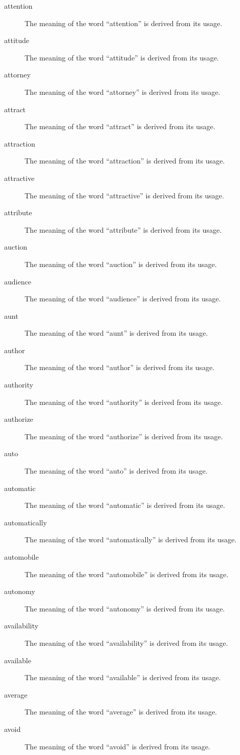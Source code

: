 \documentclass[12pt, letterpaper]{memoir}
\begin{document}
\begin{description}
\item[attention] The meaning of the word ``attention'' is derived from its usage.
\item[attitude] The meaning of the word ``attitude'' is derived from its usage.
\item[attorney] The meaning of the word ``attorney'' is derived from its usage.
\item[attract] The meaning of the word ``attract'' is derived from its usage.
\item[attraction] The meaning of the word ``attraction'' is derived from its usage.
\item[attractive] The meaning of the word ``attractive'' is derived from its usage.
\item[attribute] The meaning of the word ``attribute'' is derived from its usage.
\item[auction] The meaning of the word ``auction'' is derived from its usage.
\item[audience] The meaning of the word ``audience'' is derived from its usage.
\item[aunt] The meaning of the word ``aunt'' is derived from its usage.
\item[author] The meaning of the word ``author'' is derived from its usage.
\item[authority] The meaning of the word ``authority'' is derived from its usage.
\item[authorize] The meaning of the word ``authorize'' is derived from its usage.
\item[auto] The meaning of the word ``auto'' is derived from its usage.
\item[automatic] The meaning of the word ``automatic'' is derived from its usage.
\item[automatically] The meaning of the word ``automatically'' is derived from its usage.
\item[automobile] The meaning of the word ``automobile'' is derived from its usage.
\item[autonomy] The meaning of the word ``autonomy'' is derived from its usage.
\item[availability] The meaning of the word ``availability'' is derived from its usage.
\item[available] The meaning of the word ``available'' is derived from its usage.
\item[average] The meaning of the word ``average'' is derived from its usage.
\item[avoid] The meaning of the word ``avoid'' is derived from its usage.

\end{description}
\end{document}
